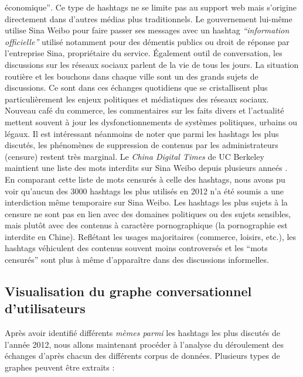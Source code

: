 \'economique{\textquotedblright}\textit{. }Ce type de hashtags ne se
limite pas au support web mais s{\textquoteright}origine directement
dans d{\textquoteright}autres m\'edias plus traditionnels. Le
gouvernement lui-m\^eme utilise Sina Weibo pour faire passer ses
messages avec un hashtag \textit{{\textquotedblleft}information
officielle{\textquotedblright} }utilis\'e notamment pour des d\'ementis
publics ou droit de r\'eponse par l{\textquoteright}entreprise Sina,
propri\'etaire du service. \'Egalement outil de conversation, les
discussions sur les r\'eseaux sociaux parlent de la vie de tous les
jours. La situation routi\`ere et les bouchons dans chaque ville sont
un des grands sujets de discussions. Ce sont dans ces \'echanges
quotidiens que se cristallisent plus particuli\`erement les enjeux
politiques et m\'ediatiques des r\'eseaux sociaux. Nouveau caf\'e du
commerce, les commentaires sur les faits divers et
l{\textquoteright}actualit\'e mettent souvent \`a jour les
dysfonctionnements de syst\`emes politiques, urbains ou l\'egaux. Il
est int\'eressant n\'eanmoins de noter que parmi les hashtags les plus
discut\'es, les ph\'enom\`enes de suppression de contenus par les
administrateurs (censure) restent tr\`es marginal. Le \textit{China
Digital Times} de UC Berkeley maintient une liste des mots interdits
sur Sina Weibo depuis plusieurs anne\'es \citep{Ng2013}. En comparant cette
liste de mots censur\'es \`a celle des hashtags, nous avons pu voir
qu{\textquoteright}aucun des 3000 hashtags les plus utilis\'es en 2012
n{\textquoteright}a \'et\'e soumis a une interdiction m\^eme temporaire
sur Sina Weibo. Les hashtags les plus sujets \`a la censure ne sont pas
en lien avec des domaines politiques ou des sujets sensibles, mais
plut\^ot avec des contenus \`a caract\`ere pornographique (la
pornographie est interdite en Chine). Refl\'etant les usages
majoritaires (commerce, loisirs, etc.), les hashtags v\'ehiculent des
contenus souvent moins controvers\'es et les {\textquotedblleft}mots
censur\'es{\textquotedblright} sont plus \`a m\^eme
d{\textquoteright}appara\^itre dans des discussions informelles.

\subsection[Visualisation du graphe conversationnel d{\textquoteright}utilisateurs]{Visualisation du graphe conversationnel d{\textquoteright}utilisateurs}
Apr\`es avoir identifi\'e diff\'erents \textit{m\`emes parmi }les
hashtags les plus discut\'es de l{\textquoteright}ann\'ee 2012, nous
allons maintenant proc\'eder \`a l{\textquoteright}analyse du
d\'eroulement des \'echanges d{\textquoteright}apr\`es chacun des
diff\'erents corpus de donn\'ees. Plusieurs types de graphes peuvent
\^etre extraits :


